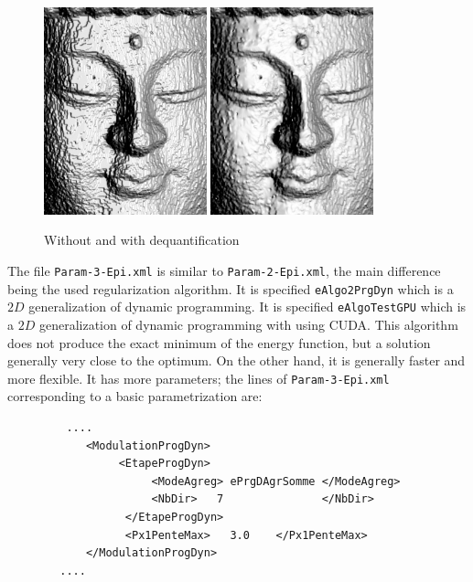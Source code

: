 \begin{figure}
\begin{center}
\includegraphics[height=60mm]{FIGS/Boudhas/ShadeQuant.jpg}
\includegraphics[height=60mm]{FIGS/Boudhas/ShadeDeQuant.jpg}
\caption{Without and with dequantification}
\label{FIG:DISP:DEQUANT}
\end{center}
\end{figure}


The file {\tt Param-3-Epi.xml} is similar to {\tt Param-2-Epi.xml}, the
main difference being the used regularization algorithm. It is specified
{\tt eAlgo2PrgDyn} which is a $2D$ generalization of dynamic programming.
It is specified {\tt eAlgoTestGPU} which is a $2D$ generalization of dynamic programming with using CUDA.
This algorithm does not produce the exact minimum of the energy function,
but a solution generally very close to the optimum. On the other hand,
it is generally faster and more flexible. It has more parameters;
the lines of {\tt Param-3-Epi.xml} corresponding to a basic
parametrization are:

{\scriptsize
\begin{verbatim}
         ....
            <ModulationProgDyn>
                 <EtapeProgDyn>
                      <ModeAgreg> ePrgDAgrSomme </ModeAgreg>
                      <NbDir>   7               </NbDir>
                  </EtapeProgDyn>
                  <Px1PenteMax>   3.0    </Px1PenteMax>
            </ModulationProgDyn>
        ....

\end{verbatim}
}

